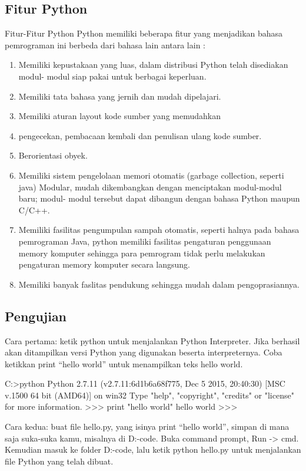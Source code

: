 \begin{enumerate}
\subsection{Fitur Python}
Fitur-Fitur Python Python memiliki beberapa fitur yang menjadikan bahasa pemrograman ini berbeda dari bahasa lain antara lain :
\begin{enumerate}
\item Memiliki kepustakaan yang luas, dalam distribusi Python telah disediakan modul- modul siap pakai untuk berbagai keperluan.
\item Memiliki tata bahasa yang jernih dan mudah dipelajari.
\item Memiliki aturan layout kode sumber yang memudahkan
\item pengecekan, pembacaan kembali dan penulisan ulang kode sumber.
\item Berorientasi obyek.
\item Memiliki sistem pengelolaan memori otomatis (garbage collection, seperti java) Modular, mudah dikembangkan dengan menciptakan modul-modul baru; modul- modul tersebut dapat dibangun dengan bahasa Python maupun C/C++.
\item Memiliki fasilitas pengumpulan sampah otomatis, seperti halnya pada bahasa pemrograman Java, python memiliki fasilitas pengaturan penggunaan memory komputer sehingga para pemrogram tidak perlu melakukan pengaturan memory komputer secara langsung.
\item Memiliki banyak faslitas pendukung sehingga mudah dalam pengoprasiannya.
\end{enumerate}

\subsection{Pengujian}
Cara pertama: ketik python untuk menjalankan Python Interpreter. Jika berhasil akan ditampilkan versi Python yang digunakan beserta interpreternya. Coba ketikkan print “hello world” untuk menampilkan teks hello world.

C:>python
Python 2.7.11 (v2.7.11:6d1b6a68f775, Dec  5 2015, 20:40:30) [MSC v.1500 64 bit (AMD64)] on win32
Type "help", "copyright", "credits" or "license" for more information.
>>> print "hello world"
hello world
>>>

Cara kedua: buat file hello.py, yang isinya print “hello world”, simpan di mana saja suka-suka kamu, misalnya di D:\python-code. Buka command prompt, Run -> cmd. Kemudian masuk ke folder D:\python-code, lalu ketik python hello.py untuk menjalankan file Python yang telah dibuat.


\end{enumerate}
